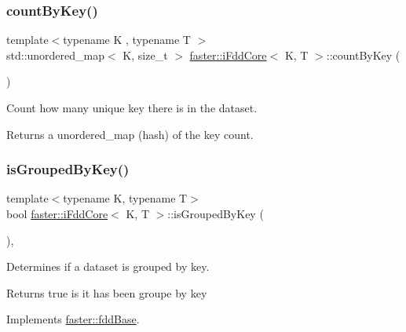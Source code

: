 \subsubsection{\texorpdfstring{count\+By\+Key()}{countByKey()}}
{\footnotesize\ttfamily template$<$typename K , typename T $>$ \\
std\+::unordered\+\_\+map$<$ K, size\+\_\+t $>$ \hyperlink{classfaster_1_1iFddCore}{faster\+::i\+Fdd\+Core}$<$ K, T $>$\+::count\+By\+Key (\begin{DoxyParamCaption}{ }\end{DoxyParamCaption})}



Count how many unique key there is in the dataset. 

\begin{DoxyReturn}{Returns}
a unordered\+\_\+map (hash) of the key count. 
\end{DoxyReturn}
\hypertarget{classfaster_1_1iFddCore_a85b2607d1cc8f604a3965c313f16b240}{}\label{classfaster_1_1iFddCore_a85b2607d1cc8f604a3965c313f16b240} 
\subsubsection{\texorpdfstring{is\+Grouped\+By\+Key()}{isGroupedByKey()}}
{\footnotesize\ttfamily template$<$typename K, typename T$>$ \\
bool \hyperlink{classfaster_1_1iFddCore}{faster\+::i\+Fdd\+Core}$<$ K, T $>$\+::is\+Grouped\+By\+Key (\begin{DoxyParamCaption}{ }\end{DoxyParamCaption})\hspace{0.3cm}{\ttfamily [inline]}, {\ttfamily [virtual]}}



Determines if a dataset is grouped by key. 

\begin{DoxyReturn}{Returns}
true is it has been groupe by key 
\end{DoxyReturn}


Implements \hyperlink{classfaster_1_1fddBase}{faster\+::fdd\+Base}.

\hypertarget{classfaster_1_1iFddCore_a6058211f45b0f603ff6e2ffab1976148}{}\label{classfaster_1_1iFddCore_a6058211f45b0f603ff6e2ffab1976148} 
